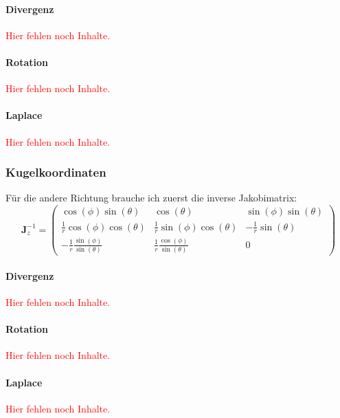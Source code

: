 \documentclass[11pt, ngerman]{article}
\newcommand{\fehlt}{\textcolor{red}{Hier fehlen noch Inhalte.}}
\newcommand{\tens}[1]{\boldsymbol{#1}}
\begin{document}
\paragraph{Divergenz}

\fehlt

\paragraph{Rotation}

\fehlt

\paragraph{Laplace}

\fehlt

\subsubsection{Kugelkoordinaten}

Für die andere Richtung brauche ich zuerst die inverse Jakobimatrix:
\[
	\tens J_z^{-1} =
	\begin{pmatrix}
		\cos(\phi)\sin(\theta) & \cos(\theta) & \sin(\phi)\sin(\theta) \\
		\frac 1r \cos(\phi) \cos(\theta) & \frac 1r \sin(\phi) \cos(\theta) & - \frac 1r \sin(\theta) \\
		- \frac 1r \frac{\sin(\phi)}{\sin(\theta)} & \frac 1r \frac{\cos(\phi)}{\sin(\theta)} & 0
	\end{pmatrix}
\]

\paragraph{Divergenz}

\fehlt

\paragraph{Rotation}

\fehlt

\paragraph{Laplace}

\fehlt

\end{document}
